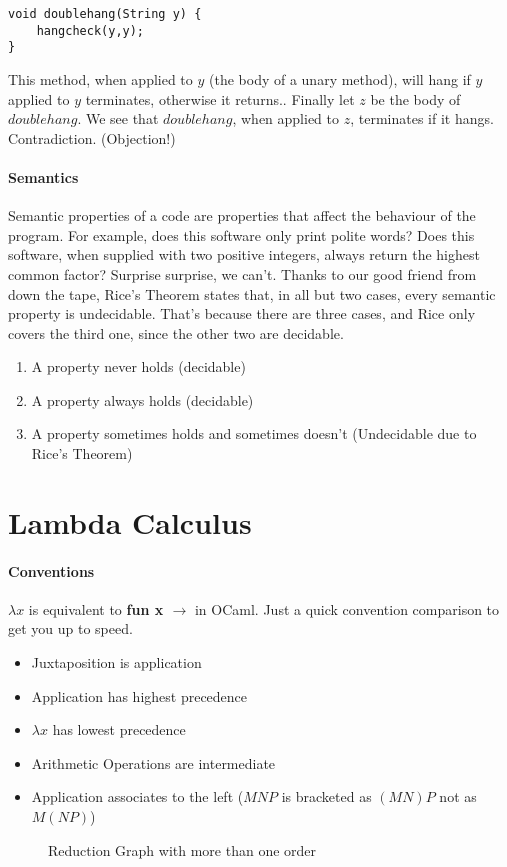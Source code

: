 \begin{verbatim}
void doublehang(String y) {
    hangcheck(y,y);
}
\end{verbatim}
This method, when applied to $y$ (the body of a unary method), will hang if $y$ applied to $y$ terminates, otherwise it returns.. Finally let $z$ be the body of $doublehang$. We see that $doublehang$, when applied to $z$, terminates if it hangs. Contradiction. (Objection!)
\paragraph{Semantics} Semantic properties of a code are properties that affect the behaviour of the program. For example, does this software only print polite words? Does this software, when supplied with two positive integers, always return the highest common factor? Surprise surprise, we can't. Thanks to our good friend from down the tape, Rice's Theorem states that, in all but two cases, every semantic property is undecidable. That's because there are three cases, and Rice only covers the third one, since the other two are decidable.
\begin{enumerate}
	\item A property never holds (decidable)
	\item A property always holds (decidable)
	\item A property sometimes holds and sometimes doesn't (Undecidable due to Rice's Theorem) 
\end{enumerate}
\section{Lambda Calculus}
\paragraph{Conventions}  $\lambda x$ is equivalent to \textbf{fun x $\rightarrow$} in OCaml. Just a quick convention comparison to get you up to speed. 
\begin{itemize}
	\item Juxtaposition is application
	\item Application has highest precedence
	\item $\lambda x$ has lowest precedence
	\item Arithmetic Operations are intermediate
	\item Application associates to the left ($M N P$ is bracketed as $(M N) P$ not as  $M (N P)$)
\end{itemize}
\begin{figure}[!htb]
	\caption{\label{fig:reduct} Reduction Graph with more than one order}
\end{figure}
